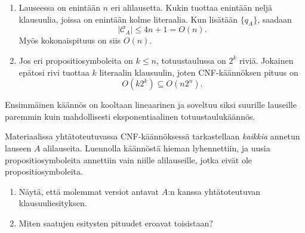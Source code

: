 \documentclass[11pt,a4paper]{amsart}
\begin{document}
\begin{solution}
\leavevmode\par
\begin{enumerate}[label=\alph*)]
\item Lauseessa on enintään \(n\) eri alilausetta. Kukin tuottaa
  enintään neljä klausuulia, joissa on enintään kolme literaalia.
  Kun lisätään \(\{q_A\}\), saadaan
  \[
    |\mathcal C_A|\le 4n+1=O(n).
  \]
  Myös kokonaispituus on siis \(O(n)\).

\item Jos eri propositiosymboleita on \(k\le n\), totuustaulussa on
  \(2^k\) riviä. Jokainen epätosi rivi tuottaa \(k\) literaalin
  klausuulin, joten CNF-käännöksen pituus on
  \[
    O(k2^k)\subseteq O(n2^n).
  \]
\end{enumerate}

Ensimmäinen käännös on kooltaan lineaarinen ja soveltuu siksi suurille
lauseille paremmin kuin mahdollisesti eksponentiaalinen totuustaulukäännös.
\end{solution}

\begin{exercise}
Materiaalissa yhtätoteutuvassa CNF-käännöksessä tarkastellaan \emph{kaikkia}
annetun lauseen \(A\) alilauseita. Luennolla käännöstä hieman lyhennettiin,
ja uusia propositiosymboleita annettiin vain niille alilauseille, jotka
eivät ole propositiosymboleita.
\begin{enumerate}[label=\alph*), nosep]
\item Näytä, että molemmat versiot antavat \(A\):n kanssa yhtätoteutuvan
klausuuliesityksen.
\item Miten saatujen esitysten pituudet eroavat toisistaan?
\end{enumerate}
\end{exercise}
\end{document}
